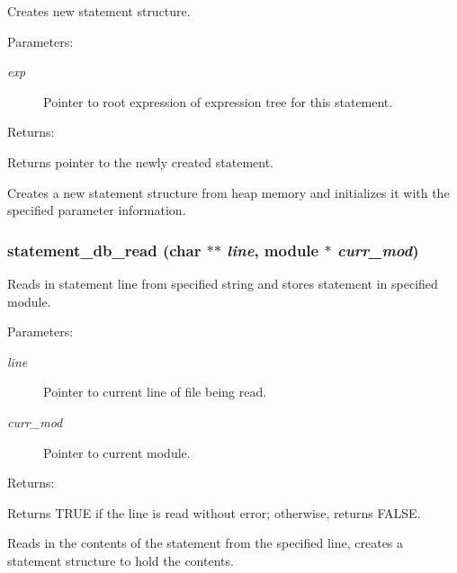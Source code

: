 Creates new statement structure.

\begin{Desc}
\item[Parameters: ]\par
\begin{description}
\item[{\em 
exp}]Pointer to root expression of expression tree for this statement.\end{description}
\end{Desc}
\begin{Desc}
\item[Returns: ]\par
Returns pointer to the newly created statement.\end{Desc}
Creates a new statement structure from heap memory and initializes it with the specified parameter information. 
\subsubsection{ statement\_\-db\_\-read (char $\ast$$\ast$ {\em line}, {\bf module} $\ast$ {\em curr\_\-mod})}\label{statement_8h_a2}


Reads in statement line from specified string and stores statement in specified module.

\begin{Desc}
\item[Parameters: ]\par
\begin{description}
\item[{\em 
line}]Pointer to current line of file being read. \item[{\em 
curr\_\-mod}]Pointer to current module.\end{description}
\end{Desc}
\begin{Desc}
\item[Returns: ]\par
Returns TRUE if the line is read without error; otherwise, returns FALSE.\end{Desc}
Reads in the contents of the statement from the specified line, creates a statement structure to hold the contents. 
